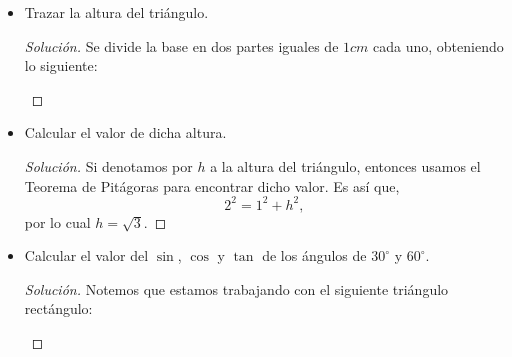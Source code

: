\documentclass[12pt]{article}
\begin{document}
\begin{enumerate}[leftmargin=*]
\begin{center}
\end{center}
\begin{itemize}
    \item Trazar la altura del tri\'angulo.
    \begin{proof}[Soluci\'on]Se divide la base en dos partes iguales de $1 cm$ cada uno, obteniendo lo siguiente:
    \begin{center}
\end{center}

        
    \end{proof}
    \item Calcular el valor de dicha altura.
    \begin{proof}[Soluci\'on] Si denotamos por $h$ a la altura del tri\'angulo, entonces usamos el Teorema de Pit\'agoras para encontrar dicho valor. Es as\'i que,
    \[
    2^2 = 1^2 +h^2,
    \]
    por lo cual $h = \sqrt{3}.$
    \end{proof}
    \item Calcular el valor del $\sin$, $\cos$ y $\tan$ de los \'angulos de $30^\circ$ y $60^\circ$.
    \begin{proof}[Soluci\'on]
    Notemos que estamos trabajando con el siguiente tri\'angulo rect\'angulo:
    \begin{center}
    \begin{tikzpicture}[scale=2.5] 
    


\end{tikzpicture}
\end{center}
\end{proof}
\end{itemize}
\end{enumerate}
\end{document}
